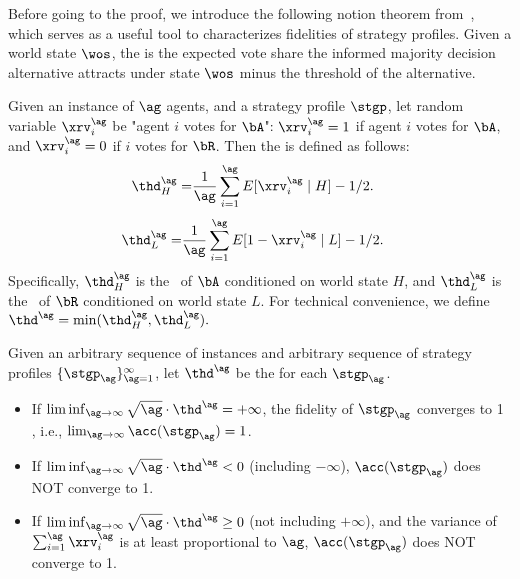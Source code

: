 Before going to the proof, we introduce the following notion theorem from~\citep{han2023wisdom}, which serves as a useful tool to characterizes fidelities of strategy profiles. 
Given a world state $\wos$, the \exshare{} is the expected vote share the informed majority decision alternative attracts under state $\wos$ minus the threshold of the alternative. 
\begin{definition}
   Given an instance of $\ag$ agents, and a strategy profile $\stgp$, let random variable $\xrv_{i}^{\ag}$ be "agent $i$ votes for $\bA$":  $\xrv_{i}^{\ag} = 1$ if agent $i$ votes for $\bA$, and $\xrv_{i}^{\ag} = 0$ if $i$ votes for $\bR$. Then the \exshare{} is defined as follows: 
\begin{align}
    \thd^{\ag}_{H} =& \frac{1}{\ag}\sum_{i=1}^{\ag}E[\xrv_{i}^{\ag}\mid H] - 1/2.\label{eq:hthdh}
\end{align}
\begin{align}
    \thd^{\ag}_{L} =&  \frac{1}{\ag}\sum_{i=1}^{\ag}E[1-\xrv_{i}^{\ag}\mid L] - 1/2\label{eq:hthdl}. 
\end{align}
Specifically, $\thd_H^{\ag}$ is the \exshare\ of $\bA$ conditioned on world state $H$, and $\thd_L^{\ag}$ is the \exshare\ of $\bR$ conditioned on world state $L$. For technical convenience, we define $\thd^{\ag} = \min(\thd^{\ag}_H, \thd^{\ag}_L).$ 
\end{definition}

\begin{theorem}
\label{thm:arbitrary}
Given an arbitrary sequence of instances and arbitrary sequence of strategy profiles $\{\stgp_{\ag}\}_{\ag=1}^\infty$, let $\thd^\ag$ be the \exshare{} for each $\stgp_{\ag}$.
\begin{itemize}
     \item If $\liminf_{\ag\to\infty} \sqrt{\ag}\cdot \thd^{\ag} = +\infty$, the fidelity of $\stgp_{\ag}$ converges to 1 , i.e., $\lim_{\ag\to\infty} \acc(\stgp_{\ag}) = 1$. 
     \item If $\liminf_{\ag\to\infty} \sqrt{\ag}\cdot \thd^{\ag} < 0$ (including $-\infty$), $\acc(\stgp_{\ag})$ does NOT converge to 1. 
     \item If $\liminf_{\ag\to\infty} \sqrt{\ag}\cdot \thd^{\ag} \ge 0$ (not including $+\infty$), and the variance of $\sum_{i=1}^{\ag} \xrv_{i}^{\ag}$ is at least proportional to $\ag$,  $\acc(\stgp_{\ag})$ does NOT converge to 1. 
\end{itemize}
\end{theorem}

